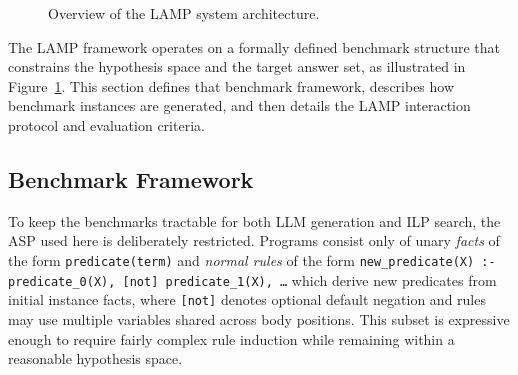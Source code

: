 \documentclass[11pt,a4paper]{article}
\begin{document}
\begin{figure}[t]
{%
  }

  \caption{Overview of the LAMP system architecture.}
  \label{fig:lamp_process}
\end{figure}

The LAMP framework operates on a formally defined benchmark structure that constrains the hypothesis space and the target answer set, as illustrated in Figure~\ref{fig:lamp_process}. This section defines that benchmark framework, describes how benchmark instances are generated, and then details the LAMP interaction protocol and evaluation criteria.

\subsection{Benchmark Framework}\label{sec:benchmark}

To keep the benchmarks tractable for both LLM generation and ILP search, the ASP used here is deliberately restricted. Programs consist only of unary \textit{facts} of the form \texttt{predicate(term)} and \textit{normal rules} of the form \texttt{new\_predicate(X) :- predicate\_0(X), [not] predicate\_1(X), \ldots} which derive new predicates from initial instance facts, where \texttt{[not]} denotes optional default negation and rules may use multiple variables shared across body positions. This subset is expressive enough to require fairly complex rule induction while remaining within a reasonable hypothesis space.
\end{document}
